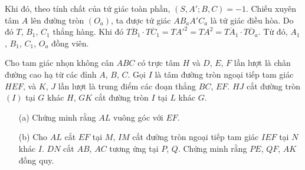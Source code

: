 \begin{solution}
\begin{enumerate}
                Khi đó, theo tính chất của tứ giác toàn phần, \((S,A';B,C) = -1\). Chiếu xuyên tâm \(A\) lên đường tròn \((O_a)\), ta được tứ giác \(AB_aA'C_a\) là tứ giác điều hòa. Do đó \(T\), \(B_1\), \(C_1\) thẳng hàng. Khi đó \(\overline{TB_1} \cdot \overline{TC_1} = TA'^2 = TA^2 = \overline{TA_1} \cdot \overline{TO_a}\). Từ đó, \(A_1\), \(B_1\), \(C_1\), \(O_a\) đồng viên.
            \end{enumerate}
        \end{solution}

        \begin{problem}
            Cho tam giác nhọn không cân \(ABC\) có trực tâm \(H\) và \(D\), \(E\), \(F\) lần lượt là chân đường cao hạ từ các đỉnh \(A\), \(B\), \(C\). Gọi \(I\) là tâm đường tròn ngoại tiếp tam giác \(HEF\), và \(K\), \(J\) lần lượt là trung điểm các đoạn thẳng \(BC\), \(EF\). \(HJ\) cắt đường tròn \((I)\) tại \(G\) khác \(H\), \(GK\) cắt đường tròn \(I\) tại \(L\) khác \(G\).
            \begin{enumerate}
                \item[(a)] Chứng minh rằng \(AL\) vuông góc với \(EF\).
                \item[(b)] Cho \(AL\) cắt \(EF\) tại \(M\), \(IM\) cắt đường tròn ngoại tiếp tam giác \(IEF\) tại \(N\) khác \(I\). \(DN\) cắt \(AB\), \(AC\) tương ứng tại \(P\), \(Q\). Chứng minh rằng \(PE\), \(QF\), \(AK\) đồng quy.
            \end{enumerate}
        \end{problem}

